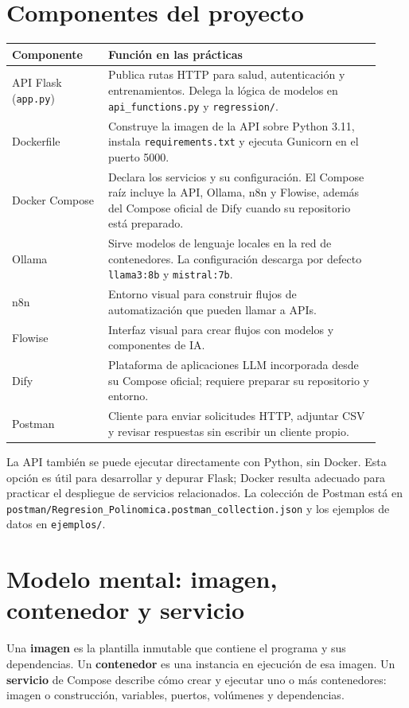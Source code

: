 \documentclass[11pt,a4paper]{article}
\begin{document}
\section{Componentes del proyecto}
\begin{longtable}{p{0.24\linewidth}p{0.68\linewidth}}
\toprule
Componente & Función en las prácticas\\\midrule
API Flask (\texttt{app.py}) & Publica rutas HTTP para salud, autenticación y entrenamientos. Delega la lógica de modelos en \texttt{api\_functions.py} y \texttt{regression/}.\\
Dockerfile & Construye la imagen de la API sobre Python 3.11, instala \texttt{requirements.txt} y ejecuta Gunicorn en el puerto 5000.\\
Docker Compose & Declara los servicios y su configuración. El Compose raíz incluye la API, Ollama, n8n y Flowise, además del Compose oficial de Dify cuando su repositorio está preparado.\\
Ollama & Sirve modelos de lenguaje locales en la red de contenedores. La configuración descarga por defecto \texttt{llama3:8b} y \texttt{mistral:7b}.\\
n8n & Entorno visual para construir flujos de automatización que pueden llamar a APIs.\\
Flowise & Interfaz visual para crear flujos con modelos y componentes de IA.\\
Dify & Plataforma de aplicaciones LLM incorporada desde su Compose oficial; requiere preparar su repositorio y entorno.\\
Postman & Cliente para enviar solicitudes HTTP, adjuntar CSV y revisar respuestas sin escribir un cliente propio.\\
\bottomrule
\end{longtable}

La API también se puede ejecutar directamente con Python, sin Docker. Esta opción es útil para desarrollar y depurar Flask; Docker resulta adecuado para practicar el despliegue de servicios relacionados. La colección de Postman está en \texttt{postman/Regresion\_Polinomica.postman\_collection.json} y los ejemplos de datos en \texttt{ejemplos/}.

\section{Modelo mental: imagen, contenedor y servicio}
Una \textbf{imagen} es la plantilla inmutable que contiene el programa y sus dependencias. Un \textbf{contenedor} es una instancia en ejecución de esa imagen. Un \textbf{servicio} de Compose describe cómo crear y ejecutar uno o más contenedores: imagen o construcción, variables, puertos, volúmenes y dependencias.
\end{document}
